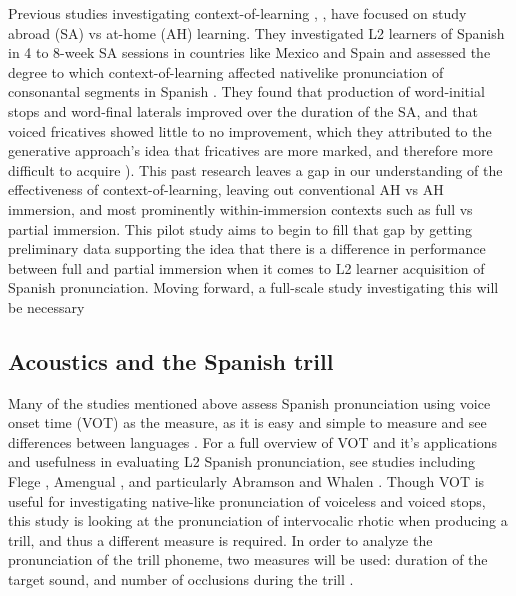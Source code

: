 \documentclass[
  a4paper,
  11pt,
  twocolumn]{article}
\begin{document}
Previous studies investigating context-of-learning
\cite{simoes_phonetics_1996}, \cite{lord_combined_2000},
\cite{diaz-campos_immersion_2004} have focused on study abroad (SA) vs
at-home (AH) learning. They investigated L2 learners of Spanish in 4 to
8-week SA sessions in countries like Mexico and Spain and assessed the
degree to which context-of-learning affected nativelike pronunciation of
consonantal segments in Spanish \cite{diaz-campos_immersion_2004}. They
found that production of word-initial stops and word-final laterals
improved over the duration of the SA, and that voiced fricatives showed
little to no improvement, which they attributed to the generative
approach's idea that fricatives are more marked, and therefore more
difficult to acquire \cite{diaz-campos_immersion_2004}). This past
research leaves a gap in our understanding of the effectiveness of
context-of-learning, leaving out conventional AH vs AH immersion, and
most prominently within-immersion contexts such as full vs partial
immersion. This pilot study aims to begin to fill that gap by getting
preliminary data supporting the idea that there is a difference in
performance between full and partial immersion when it comes to L2
learner acquisition of Spanish pronunciation. Moving forward, a
full-scale study investigating this will be necessary

\subsection{Acoustics and the Spanish trill}

Many of the studies mentioned above assess Spanish pronunciation using
voice onset time (VOT) as the measure, as it is easy and simple to
measure and see differences between languages
\cite{abramson_voice-timing_1964}. For a full overview of VOT and it's
applications and usefulness in evaluating L2 Spanish pronunciation, see
studies including Flege \cite{flege_factors_1988}, Amengual
\cite{amengual_interlingual_2012}, and particularly Abramson and Whalen
\cite{abramson_voice_2017}. Though VOT is useful for investigating
native-like pronunciation of voiceless and voiced stops, this study is
looking at the pronunciation of intervocalic rhotic when producing a
trill, and thus a different measure is required. In order to analyze the
pronunciation of the trill phoneme, two measures will be used: duration
of the target sound, and number of occlusions during the trill
\cite{amengual_acoustic_2016}.
\end{document}

